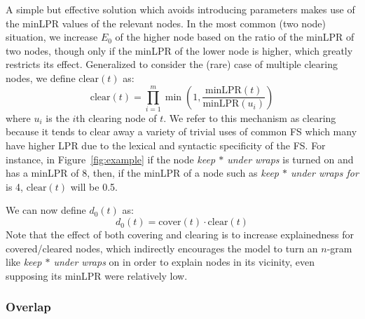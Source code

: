 \documentclass[11pt,letterpaper]{article}
\newcommand{\gap}{$*$\xspace}
\newcommand{\ex}[1]{\textit{#1}\xspace}
\newcommand{\minLPR}{\ensuremath{\text{minLPR}}}
\newcommand{\cover}{\ensuremath{\text{cover}}\xspace}
\newcommand{\clear}{\ensuremath{\text{clear}}\xspace}
\newcommand{\figref}[2][]{Figure#1~\ref{#2}\xspace}
\begin{document}
A simple but effective solution which avoids introducing parameters makes use of the minLPR values of the relevant nodes. In the most common (two node) situation, we increase $E_{0}$ of the higher node based on the ratio of the minLPR of two nodes, though only if the minLPR of the lower node is higher, which greatly restricts its effect. Generalized to consider the (rare) case of multiple clearing nodes, we define $\clear(t)$ as:
\begin{displaymath}
\clear(t) = \prod_{i=1}^{m}{\min(1,\frac{\minLPR(t)}{\minLPR(u_i)})}
\end{displaymath}
where $u_i$ is the $i$th clearing node of $t$. We refer to this mechanism as clearing because it tends to clear away a variety of trivial uses of common FS which many have higher LPR due to the lexical and syntactic specificity of the FS. For instance, in \figref{fig:example} if the node \ex{keep \gap under wraps}  is turned on and has a minLPR of 8, then, if the minLPR of a node such as \ex{keep \gap under wraps for} is 4, $\clear(t)$ will be 0.5. 

We can now define $d_{0}(t)$ as:
\begin{displaymath}
d_0(t) = \cover(t) \cdot \clear(t)
\end{displaymath}
Note that the effect of both covering and clearing is to  increase explainedness for covered/cleared nodes, which indirectly encourages the model to turn an $n$-gram like \ex{keep \gap under wraps} on in order to explain nodes in its vicinity, even supposing its minLPR were relatively low.


\subsubsection{Overlap}
\end{document}
